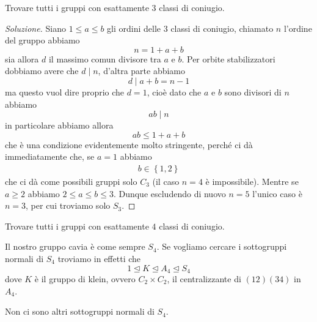 \documentclass[11pt]{scrartcl}
\newcommand{\normal}{\mathrel{\unlhd}}
\begin{document}
	 \begin{exercise}
	 	Trovare tutti i gruppi con esattamente $3$ classi di coniugio.
	 \end{exercise}
	 \begin{proof}[Soluzione]
	 	Siano $1\le a \le b$ gli ordini delle $3$ classi di coniugio, chiamato $n$ l'ordine del gruppo abbiamo
	 	$$n=1+a+b$$
	 	sia allora $d$ il massimo comun divisore tra $a$ e $b$. Per orbite stabilizzatori dobbiamo avere che $d\mid n$, d'altra parte abbiamo 
	 	$$d\mid a+b=n-1$$
	 	ma questo vuol dire proprio che $d=1$, cioè dato che $a$ e $b$ sono divisori di $n$ abbiamo
	 	$$ab\mid n$$
	 	in particolare abbiamo allora 
	 	$$ab\le 1+a+b$$
	 	che è una condizione evidentemente molto stringente, perché ci dà immediatamente che, se $a=1$ abbiamo \begin{gather*}
	 		b\in \left\{1,2\right\}
	 	\end{gather*}
	 	che ci dà come possibili gruppi solo $C_3$ (il caso $n=4$ è impossibile). Mentre se $a\ge 2$ abbiamo $2\le a\le b\le 3$. Dunque escludendo di nuovo $n=5$ l'unico caso è $n=3$, per cui troviamo solo $S_3$.
	 \end{proof}
	 \begin{exercise}
	 	Trovare tutti i gruppi con esattamente $4$ classi di coniugio.
	 \end{exercise}
	 Il nostro gruppo cavia è come sempre $S_4$. Se vogliamo cercare i sottogruppi normali di $S_4$ troviamo in effetti che
	 $$1\normal K \normal A_4 \normal S_4$$
	 dove $K$ è il gruppo di klein, ovvero $C_2\times C_2$, il centralizzante di $(12)(34)$ in $A_4$. 
	 \begin{claim}
	 	Non ci sono altri sottogruppi normali di $S_4$.
	 \end{claim}
\end{document}

